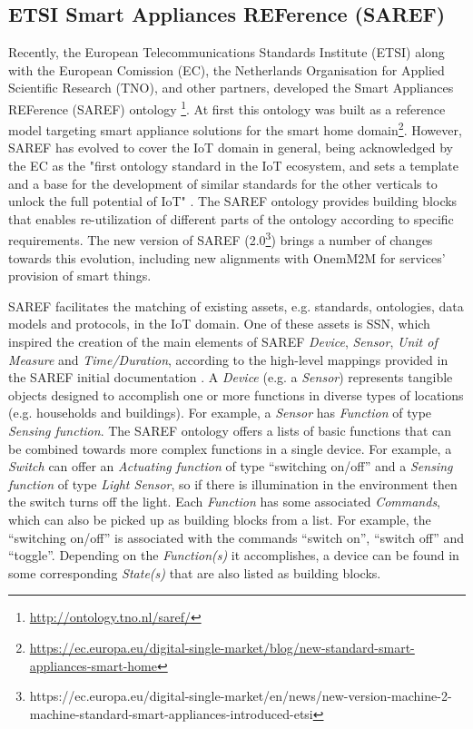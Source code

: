 \documentclass{sig-alternate-05-2015}
\begin{document}

\subsection{ETSI Smart Appliances REFerence (SAREF)}
Recently, the European Telecommunications Standards Institute (ETSI) along with the European Comission (EC), the Netherlands Organisation for Applied Scientific Research (TNO), and other partners, developed the Smart Appliances REFerence (SAREF) ontology \cite{Daniele2015,Daniele2016}\footnote{\url{http://ontology.tno.nl/saref/}}. At first this ontology was built as a reference model targeting smart appliance solutions for the smart home domain\footnote{\url{https://ec.europa.eu/digital-single-market/blog/new-standard-smart-appliances-smart-home}}. However, SAREF has evolved to cover the IoT domain in general, being acknowledged by the EC as the "first ontology standard in the IoT ecosystem, and sets a template and a base for the development of similar standards for the other verticals to unlock the full potential of IoT" \cite{Daniele2016b}. The SAREF ontology provides building blocks that enables re-utilization of different parts of the ontology according to specific requirements. The new version of SAREF (2.0\footnote{https://ec.europa.eu/digital-single-market/en/news/new-version-machine-2-machine-standard-smart-appliances-introduced-etsi}) brings a number of changes towards this evolution, including new alignments with OnemM2M for services' provision of smart things. 

SAREF facilitates the matching of existing assets, e.g. standards, ontologies, data models and protocols, in the IoT domain. One of these assets is SSN, which inspired the creation of the main elements of SAREF  \textit{Device}, \textit{Sensor}, \textit{Unit of Measure} and \textit{Time/Duration}, according to the high-level mappings provided in the SAREF initial documentation \cite{Daniele2015}. A \textit{Device} (e.g. a \textit{Sensor}) represents tangible objects designed to accomplish one or more functions in diverse types of locations (e.g. households and buildings). For example, a \textit{Sensor} has \textit{Function} of type \textit{Sensing function}. The SAREF ontology offers a lists of basic functions that can be combined towards more complex functions in a single device. For example, a \textit{Switch} can offer an \textit{Actuating function} of type “switching on/off” and a \textit{Sensing function} of type \textit{Light Sensor}, so if there is illumination in the environment then the switch turns off the light. Each \textit{Function} has some associated \textit{Commands}, which can also be picked up as building blocks from a list. For example, the “switching on/off” is associated with the commands “switch on”, “switch off” and “toggle”. Depending on the \textit{Function(s)} it accomplishes, a device can be found in some corresponding \textit{State(s)} that are also listed as building blocks. 
\end{document}
